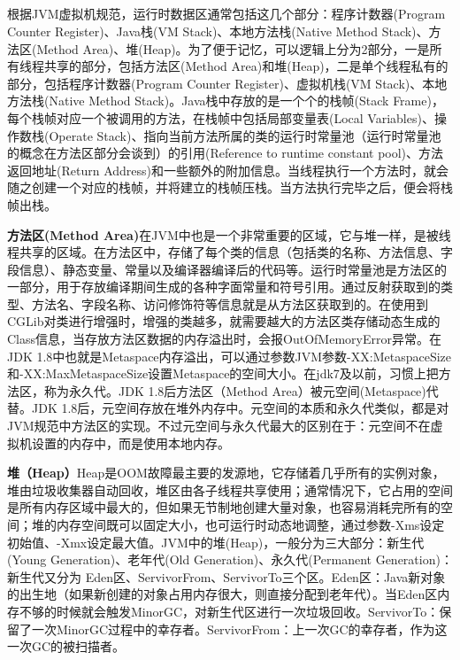 \documentclass[../../../interview-questions.tex]{subfiles}
\begin{document}
\subsection{\color{red}{Java内存模型(Java Memory Model)}}

根据JVM虚拟机规范，运行时数据区通常包括这几个部分：程序计数器(Program Counter Register)、Java栈(VM Stack)、本地方法栈(Native Method Stack)、方法区(Method Area)、堆(Heap)。为了便于记忆，可以逻辑上分为2部分，一是所有线程共享的部分，包括方法区(Method Area)和堆(Heap)，二是单个线程私有的部分，包括程序计数器(Program Counter Register)、虚拟机栈(VM Stack)、本地方法栈(Native Method Stack)。Java栈中存放的是一个个的栈帧(Stack Frame)，每个栈帧对应一个被调用的方法，在栈帧中包括局部变量表(Local Variables)、操作数栈(Operate Stack)、指向当前方法所属的类的运行时常量池（运行时常量池的概念在方法区部分会谈到）的引用(Reference to runtime constant pool)、方法返回地址(Return Address)和一些额外的附加信息。当线程执行一个方法时，就会随之创建一个对应的栈帧，并将建立的栈帧压栈。当方法执行完毕之后，便会将栈帧出栈。

\textbf{方法区(Method Area)}在JVM中也是一个非常重要的区域，它与堆一样，是被线程共享的区域。在方法区中，存储了每个类的信息（包括类的名称、方法信息、字段信息）、静态变量、常量以及编译器编译后的代码等。运行时常量池是方法区的一部分，用于存放编译期间生成的各种字面常量和符号引用。通过反射获取到的类型、方法名、字段名称、访问修饰符等信息就是从方法区获取到的。在使用到CGLib对类进行增强时，增强的类越多，就需要越大的方法区类存储动态生成的Class信息，当存放方法区数据的内存溢出时，会报OutOfMemoryError异常。在JDK 1.8中也就是Metaspace内存溢出，可以通过参数JVM参数-XX:MetaspaceSize和-XX:MaxMetaspaceSize设置Metaspace的空间大小。在jdk7及以前，习惯上把方法区，称为永久代。JDK 1.8后方法区（Method Area）被元空间(Metaspace)代替。JDK 1.8后，元空间存放在堆外内存中。元空间的本质和永久代类似，都是对JVM规范中方法区的实现。不过元空间与永久代最大的区别在于：元空间不在虚拟机设置的内存中，而是使用本地内存。

\textbf{堆（Heap）}Heap是OOM故障最主要的发源地，它存储着几乎所有的实例对象，堆由垃圾收集器自动回收，堆区由各子线程共享使用；通常情况下，它占用的空间是所有内存区域中最大的，但如果无节制地创建大量对象，也容易消耗完所有的空间；堆的内存空间既可以固定大小，也可运行时动态地调整，通过参数-Xms设定初始值、-Xmx设定最大值。JVM中的堆(Heap)，一般分为三大部分：新生代(Young Generation)、老年代(Old Generation)、永久代(Permanent Generation)：新生代又分为 Eden区、ServivorFrom、ServivorTo三个区。Eden区：Java新对象的出生地（如果新创建的对象占用内存很大，则直接分配到老年代）。当Eden区内存不够的时候就会触发MinorGC，对新生代区进行一次垃圾回收。ServivorTo：保留了一次MinorGC过程中的幸存者。ServivorFrom：上一次GC的幸存者，作为这一次GC的被扫描者。
\end{document}
